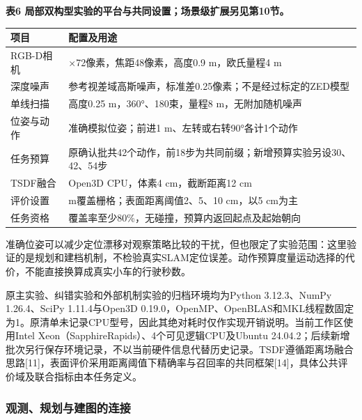 \documentclass[11pt,a4paper]{article}
\newlength{\ReviewTableWidth}
\numberwithin{equation}{section}
\begin{document}
\par\noindent\begin{minipage}{\linewidth}
\textbf{表6 局部双构型实验的平台与共同设置；场景级扩展另见第10节。}

\begin{center}
\small
\setlength{\tabcolsep}{4pt}
\setlength{\ReviewTableWidth}{\dimexpr\linewidth-2\tabcolsep\relax}
\begin{tabular}{@{}>{\raggedright\arraybackslash}p{0.24\ReviewTableWidth} >{\raggedright\arraybackslash}p{0.76\ReviewTableWidth}@{}}
\toprule
项目 & 配置及用途 \\
\midrule
RGB-D相机 & 96×72像素，焦距48像素，高度0.9 m，欧氏量程4 m \\
深度噪声 & 参考视差域高斯噪声，标准差0.25像素；不是经过标定的ZED模型 \\
单线扫描 & 高度0.25 m，360°、180束，量程8 m，无附加随机噪声 \\
位姿与动作 & 准确模拟位姿；前进1 m、左转或右转90°各计1个动作 \\
任务预算 & 原确认批共42个动作，前18步为共同前缀；新增预算实验另设30、42、54步 \\
TSDF融合 & Open3D CPU，体素4 cm，截断距离12 cm \\
评价设置 & 0.2 m覆盖栅格；表面距离阈值2、5、10 cm，以5 cm为主 \\
任务资格 & 覆盖率至少80\%，无碰撞，预算内返回起点及起始朝向 \\
\bottomrule
\end{tabular}
\end{center}
\end{minipage}


准确位姿可以减少定位漂移对观察策略比较的干扰，但也限定了实验范围：这里验证的是规划和建档机制，不检验真实SLAM定位误差。动作预算度量运动选择的代价，不能直接换算成真实小车的行驶秒数。

原主实验、纠错实验和外部机制实验的归档环境均为Python 3.12.3、NumPy 1.26.4、SciPy 1.11.4与Open3D 0.19.0，OpenMP、OpenBLAS和MKL线程数固定为1。原清单未记录CPU型号，因此其绝对耗时仅作实现开销说明。当前工作区使用Intel Xeon（SapphireRapids）、4个可见逻辑CPU及Ubuntu 24.04.2；后续新增批次另行保存环境记录，不以当前硬件信息代替历史记录。TSDF遵循距离场融合思路{[}11{]}，表面评价采用距离阈值下精确率与召回率的共同框架{[}14{]}，具体公共评价域及联合指标由本任务定义。

\hypertarget{ux89c2ux6d4bux89c4ux5212ux4e0eux5efaux56feux7684ux8fdeux63a5}{%
\subsubsection{观测、规划与建图的连接}\label{ux89c2ux6d4bux89c4ux5212ux4e0eux5efaux56feux7684ux8fdeux63a5}}
\end{document}
